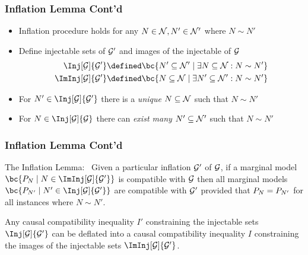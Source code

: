 \documentclass[
    hyperref={colorlinks=true, linkcolor=blue, urlcolor=blue, citecolor=MidnightBlue},
    xcolor={dvipsnames},
]{beamer}
\renewcommand{\term}[1]{\textcolor{Mahogany}{#1}}
\begin{document}
\begin{frame}
    \frametitle{Inflation Lemma Cont'd}
    \begin{itemize}
        \item Inflation procedure holds for any $N \in \mathcal{N}, N' \in \mathcal{N}'$ where $N \sim N'$
        \item Define \term{injectable sets of $\mathcal{G}'$} and \term{images of the injectable of $\mathcal{G}$}
        \begin{align*}
            \Inj[\graph]{\graph'} &\defined \bc{N' \subseteq \nodes' \mid \exists N \subseteq \nodes : N \sim N'} \\
            \ImInj[\graph]{\graph'} &\defined \bc{N \subseteq \nodes \mid \exists N' \subseteq \nodes' : N \sim N'} \\
        \end{align*}
        \item For $N' \in \Inj[\graph]{\graph'}$ there is a \textit{unique} $N \subseteq \mathcal{N}$ such that $N \sim N'$
        \item For $N \in \Inj[\graph]{\graph}$ there can \textit{exist many} $N' \subseteq \mathcal{N}'$ such that $N \sim N'$
    \end{itemize}
\end{frame}

\begin{frame}
    \frametitle{Inflation Lemma Cont'd}
    \begin{lemma}
        \term{The Inflation Lemma:}~\cite[lemma 3]{Inflation} Given a particular inflation $\mathcal{G}'$ of $\mathcal{G}$, if a marginal model $\bc{\prob[N] \mid N \in \ImInj[\graph]{\graph'}}$ is compatible with $\mathcal{G}$ then all marginal models $\bc{\prob[N'] \mid N' \in \Inj[\graph]{\graph'}}$ are compatible with $\mathcal{G}'$ provided that $\prob[N] = \prob[N']$ for all instances where $N \sim N'$.
    \end{lemma}
    \begin{corollary}
        Any causal compatibility inequality $I'$ constraining the injectable sets $\Inj[\graph]{\graph'}$ can be \term{deflated} into a causal compatibility inequality $I$ constraining the images of the injectable sets $\ImInj[\graph]{\graph'}$.
    \end{corollary}
\end{frame}
\end{document}
